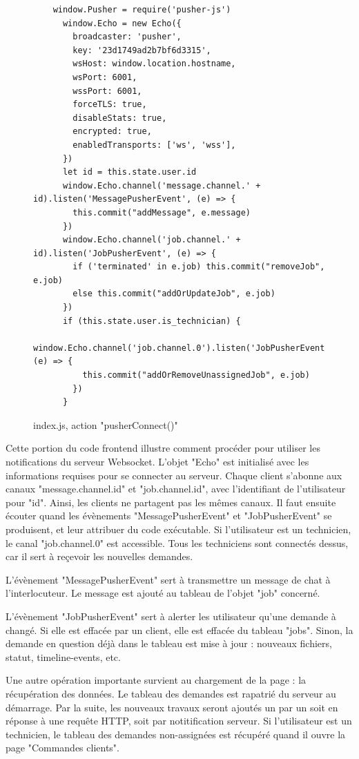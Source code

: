 \documentclass[
    iai, %
    eai, %
]{heig-tb}
\begin{document}
\begin{figure}[h]
  \begin{verbatim}
    window.Pusher = require('pusher-js')
      window.Echo = new Echo({
        broadcaster: 'pusher',
        key: '23d1749ad2b7bf6d3315',
        wsHost: window.location.hostname,
        wsPort: 6001,
        wssPort: 6001,
        forceTLS: true,
        disableStats: true,
        encrypted: true,
        enabledTransports: ['ws', 'wss'],
      })
      let id = this.state.user.id
      window.Echo.channel('message.channel.' + id).listen('MessagePusherEvent', (e) => {
        this.commit("addMessage", e.message)
      })
      window.Echo.channel('job.channel.' + id).listen('JobPusherEvent', (e) => {
        if ('terminated' in e.job) this.commit("removeJob", e.job)
        else this.commit("addOrUpdateJob", e.job)
      })
      if (this.state.user.is_technician) {
        window.Echo.channel('job.channel.0').listen('JobPusherEvent', (e) => {
          this.commit("addOrRemoveUnassignedJob", e.job)
        })
      }
  \end{verbatim}
  \caption{index.js, action "pusherConnect()"}
  \label{figure:pusherConnect}
\end{figure}

Cette portion du code frontend illustre comment procéder pour utiliser les notifications du serveur Websocket. L'objet "Echo" est initialisé avec les informations requises pour se connecter au serveur. Chaque client s'abonne aux canaux "message.channel.{id}" et "job.channel.{id}", avec l'identifiant de l'utilisateur pour "{id}". Ainsi, les clients ne partagent pas les mêmes canaux. Il faut ensuite écouter quand les évènements "MessagePusherEvent" et "JobPusherEvent" se produisent, et leur attribuer du code exécutable.
Si l'utilisateur est un technicien, le canal "job.channel.0" est accessible. Tous les techniciens sont connectés dessus, car il sert à reçevoir les nouvelles demandes.

L'évènement "MessagePusherEvent" sert à transmettre un message de chat à l'interlocuteur. Le message est ajouté au tableau de l'objet "job" concerné.

L'évènement "JobPusherEvent" sert à alerter les utilisateur qu'une demande à changé. Si elle est effacée par un client, elle est effacée du tableau "jobs". Sinon, la demande en question déjà dans le tableau est mise à jour : nouveaux fichiers, statut, timeline-events, etc.

Une autre opération importante survient au chargement de la page : la récupération des données. Le tableau des demandes est rapatrié du serveur au démarrage. Par la suite, les nouveaux travaux seront ajoutés un par un soit en réponse à une requête HTTP, soit par notitification serveur.
Si l'utilisateur est un technicien, le tableau des demandes non-assignées est récupéré quand il ouvre la page "Commandes clients".
\end{document}
